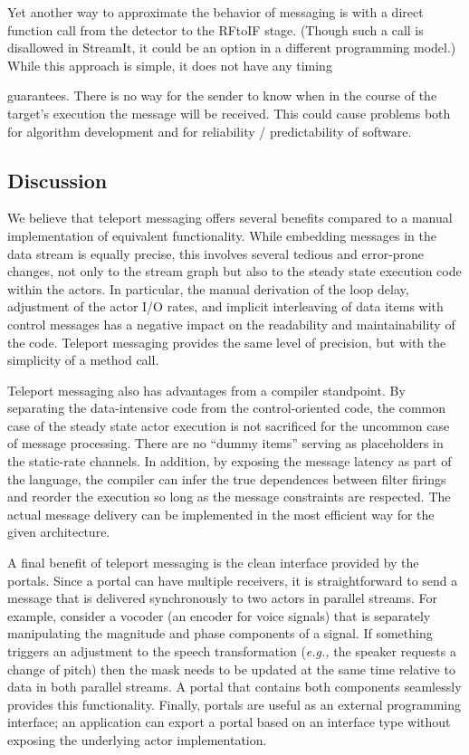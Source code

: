 Yet another way to approximate the behavior of messaging is with a
direct function call from the detector to the RFtoIF stage.  (Though
such a call is disallowed in StreamIt, it could be an option in a
different programming model.)  While this approach is simple, it does
not have any timing 



\noindent guarantees.  There is no way for the sender to know when in
the course of the target's execution the message will be received.
This could cause problems both for algorithm development and for
reliability / predictability of software.

\vspace{12pt}
\subsection{Discussion}

We believe that teleport messaging offers several benefits compared to
a manual implementation of equivalent functionality.  While embedding
messages in the data stream is equally precise, this involves several
tedious and error-prone changes, not only to the stream graph but also
to the steady state execution code within the actors.  In particular,
the manual derivation of the loop delay, adjustment of the actor I/O
rates, and implicit interleaving of data items with control messages
has a negative impact on the readability and maintainability of the
code.  Teleport messaging provides the same level of precision, but
with the simplicity of a method call.

Teleport messaging also has advantages from a compiler standpoint.  By
separating the data-intensive code from the control-oriented code, the
common case of the steady state actor execution is not sacrificed for
the uncommon case of message processing.  There are no ``dummy items''
serving as placeholders in the static-rate channels.  In addition, by
exposing the message latency as part of the language, the compiler can
infer the true dependences between filter firings and reorder the
execution so long as the message constraints are respected.  The
actual message delivery can be implemented in the most efficient way
for the given architecture.

A final benefit of teleport messaging is the clean interface provided
by the portals.  Since a portal can have multiple receivers, it is
straightforward to send a message that is delivered synchronously to
two actors in parallel streams.  For example, consider a vocoder (an
encoder for voice signals) that is separately manipulating the
magnitude and phase components of a signal.  If something triggers an
adjustment to the speech transformation ({\it e.g.,} the speaker
requests a change of pitch) then the mask needs to be updated at the
same time relative to data in both parallel streams.  A portal that
contains both components seamlessly provides this functionality.
Finally, portals are useful as an external programming interface; an
application can export a portal based on an interface type without
exposing the underlying actor implementation.

